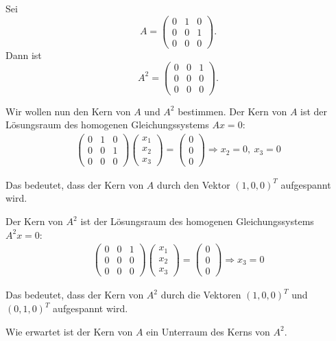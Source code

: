 \documentclass[main.tex]{subfiles}
\begin{document}
Sei
$$
    A = \begin{pmatrix}
        0 & 1 & 0 \\
        0 & 0 & 1 \\
        0 & 0 & 0
        \end{pmatrix}.
$$
Dann ist
$$
    A^2 = \begin{pmatrix}
    0 & 0 & 1 \\
    0 & 0 & 0 \\
    0 & 0 & 0
    \end{pmatrix}.
$$

Wir wollen nun den Kern von $A$ und $A^2$ bestimmen. Der Kern von $A$ ist der Lösungsraum des homogenen Gleichungssystems $Ax = 0$:
\begin{align*}
    \begin{pmatrix}
        0 & 1 & 0 \\
        0 & 0 & 1 \\
        0 & 0 & 0
    \end{pmatrix}
    \begin{pmatrix} x_1 \\ x_2 \\ x_3 \end{pmatrix}
    = \begin{pmatrix} 0 \\ 0 \\ 0 \end{pmatrix}
    \Rightarrow x_2 = 0,\ x_3 = 0
\end{align*}

Das bedeutet, dass der Kern von $A$ durch den Vektor $(1, 0, 0)^T$ aufgespannt wird.

Der Kern von $A^2$ ist der Lösungsraum des homogenen Gleichungssystems $A^2x = 0$:
\begin{align*}
    \begin{pmatrix}
        0 & 0 & 1 \\
        0 & 0 & 0 \\
        0 & 0 & 0
    \end{pmatrix}
    \begin{pmatrix} x_1 \\ x_2 \\ x_3 \end{pmatrix}
    = \begin{pmatrix} 0 \\ 0 \\ 0 \end{pmatrix}
    \Rightarrow x_3 = 0
\end{align*}

Das bedeutet, dass der Kern von $A^2$ durch die Vektoren $(1, 0, 0)^T$ und $(0, 1, 0)^T$ aufgespannt wird.

Wie erwartet ist der Kern von $A$ ein Unterraum des Kerns von $A^2$.
\end{document}
